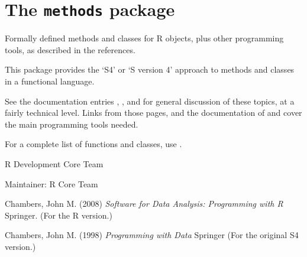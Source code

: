
\chapter{The \texttt{methods} package}
%
\begin{Description}\relax
Formally defined methods and classes for R objects, plus
other programming tools, as described in the references.
\end{Description}
%
\begin{Details}\relax
This package provides the `S4' or `S version 4' 
approach to methods and classes in a functional language.

See the documentation entries ,
, and  for general discussion of these topics, at a
fairly technical level.  Links from those pages, and the
documentation of  and 
cover the main programming tools needed.

For a complete
list of functions and classes, use .
\end{Details}
%
\begin{Author}\relax
R Development Core Team

Maintainer: R Core Team 
\end{Author}
%
\begin{References}\relax
Chambers, John M. (2008)
\emph{Software for Data Analysis: Programming with R}
Springer.  (For the R version.)

Chambers, John M. (1998)
\emph{Programming with Data}
Springer (For the original S4 version.) 
\end{References}
%
